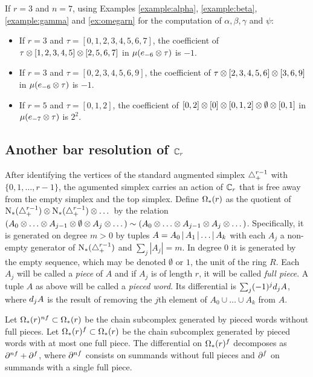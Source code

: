 \begin{example}\label{ex:omegarnfinal} If $r=3$ and $n=7$, using Examples \ref{example:alpha}, \ref{example:beta}, \ref{example:gamma} and \ref{ex:omegarn} for the computation of $\alpha,\beta,\gamma$ and $\psi$:
	\begin{itemize}
		\item If $r = 3$ and $\tau = [0,1,2,3,4,5,6,7]$, the coefficient of $\tau \otimes [1,2,3,4,5] \otimes [2,5,6,7]$ in $\mu(e_{-6} \otimes \tau)$ is $-1$.
		\item If $r = 3$ and $\tau = [0,2,3,4,5,6,9]$, the coefficient of $\tau \otimes [2,3,4,5,6] \otimes [3,6,9]$ in $\mu(e_{-6} \otimes \tau)$ is $-1$.
		\item If $r = 5$ and $\tau = [0,1,2]$, the coefficient of $[0,2] \otimes [0] \otimes [0,1,2] \otimes \emptyset \otimes [0,1]$ in $\mu(e_{-7} \otimes \tau)$ is $2^2$.
	\end{itemize}
\end{example}

\subsection{Another bar resolution of \texorpdfstring{$\mathbb{C}_r$}{the cyclic group}}

After identifying the vertices of the standard augmented simplex $\triangle_{+}^{r-1}$ with $\{0,1,\dots,r-1\}$, the agumented simplex carries an action of $\mathbb{C}_r$ that is free away from the empty simplex and the top simplex. Define $\operatorname{\Omega}_{*}(r)$ as the quotient of $\operatorname{N}_{*}(\triangle_{+}^{r-1}) \otimes \operatorname{N}_{*}(\triangle_{+}^{r-1}) \otimes \dots$ by the relation $(A_0 \ot \dots \ot A_{j-1} \ot \emptyset \ot A_j \ot \dots) \sim (A_0 \ot \dots \ot A_{j-1} \ot A_j \ot \dots)$. Specifically, it is generated on degree $m>0$ by tuples $A = A_0\operatorname{|} A_1\operatorname{|}\dots \operatorname{|} A_k$ with each $A_j$ a non-empty generator of $\operatorname{N}_{*}(\triangle_{+}^{r-1})$ and $\sum_j |A_j| = m$. In degree $0$ it is generated by the empty sequence, which may be denoted $\emptyset$ or $1$, the unit of the ring $R$. Each $A_j$ will be called a \emph{piece} of $A$ and if $A_j$ is of length $r$, it will be called \emph{full piece}. A tuple $A$ as above will be called a \emph{pieced word}. Its differential is $\sum_{j} (-1)^j d_j A$, where $d_jA$ is the result of removing the $j$th element of $A_0\cup \dots\cup A_k$ from $A$.

Let $\operatorname{\Omega}_{*}(r)^{nf} \subset \operatorname{\Omega}_{*}(r)$ be the chain subcomplex generated by pieced words without full pieces. Let $\operatorname{\Omega}_{*}(r)^{f} \subset \operatorname{\Omega}_{*}(r)$ be the chain subcomplex generated by pieced words with at most one full piece. The differential on $\operatorname{\Omega}_{*}(r)^{f}$ decomposes as $\partial^{nf}+\partial^{f}$, where $\partial^{nf}$ consists on summands without full pieces and $\partial^{f}$ on summands with a single full piece.

